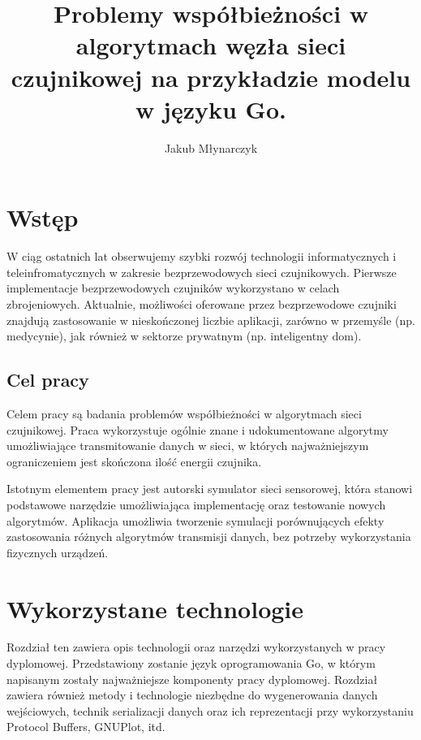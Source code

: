 \documentclass[a4paper,12pt,twoside,openany]{report}
\title{Problemy współbieżności w algorytmach węzła sieci czujnikowej na przykładzie modelu w języku Go.}
\author{Jakub Młynarczyk}
\begin{document}
\maketitle

\chapter{Wstęp}

W ciąg ostatnich lat obserwujemy szybki rozwój technologii informatycznych i teleinfromatycznych w zakresie bezprzewodowych sieci czujnikowych.
Pierwsze implementacje bezprzewodowych czujników wykorzystano w celach zbrojeniowych. Aktualnie, możliwości oferowane przez bezprzewodowe 
czujniki znajdują zastosowanie w nieskończonej liczbie aplikacji, zarówno w przemyśle (np. medycynie), jak również w sektorze prywatnym (np. inteligentny dom).


\section{Cel pracy}
Celem pracy są badania problemów współbieżności w algorytmach sieci czujnikowej. Praca wykorzystuje 
ogólnie znane i udokumentowane algorytmy umożliwiające
transmitowanie danych w sieci, w których najważniejszym ograniczeniem jest skończona ilość energii czujnika.

Istotnym elementem pracy jest autorski symulator sieci sensorowej, która stanowi podstawowe narzędzie umożliwiająca implementację oraz testowanie nowych algorytmów.
Aplikacja umożliwia tworzenie symulacji porównujących efekty zastosowania różnych algorytmów transmisji danych, bez potrzeby wykorzystania fizycznych urządzeń.

\chapter{Wykorzystane technologie}

Rozdział ten zawiera opis technologii oraz narzędzi wykorzystanych w pracy dyplomowej. 
Przedstawiony zostanie język oprogramowania Go, w którym napisanym zostały najważniejsze komponenty pracy dyplomowej. Rozdział zawiera również
metody i technologie niezbędne do wygenerowania danych wejściowych, technik serializacji danych oraz ich reprezentacji przy wykorzystaniu
Protocol Buffers, GNUPlot, itd.
\end{document}
